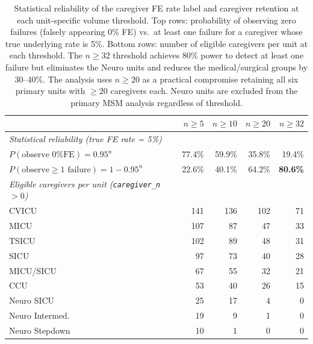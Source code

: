 \documentclass[11pt]{article}
\begin{document}
\begin{table}[h!]
\centering
\small
\begin{tabular}{lrrrr}
\toprule
 & $n \geq 5$ & $n \geq 10$ & $n \geq 20$ & $n \geq 32$ \\
\midrule
\textit{Statistical reliability (true FE rate = 5\%)} & & & & \\
\quad $P(\text{observe 0\% FE}) = 0.95^n$ & 77.4\% & 59.9\% & 35.8\% & 19.4\% \\
\quad $P(\text{observe} \geq 1 \text{ failure}) = 1 - 0.95^n$ & 22.6\% & 40.1\% & 64.2\% & \textbf{80.6\%} \\
\midrule
\textit{Eligible caregivers per unit (\texttt{caregiver\_n} $> 0$)} & & & & \\
\quad CVICU           & 141 & 136 & 102 & 71 \\
\quad MICU            & 107 &  87 &  47 & 33 \\
\quad TSICU           & 102 &  89 &  48 & 31 \\
\quad SICU            &  97 &  73 &  40 & 28 \\
\quad MICU/SICU       &  67 &  55 &  32 & 21 \\
\quad CCU             &  53 &  40 &  26 & 15 \\
\quad Neuro SICU      &  25 &  17 &   4 &  0 \\
\quad Neuro Intermed. &  19 &   9 &   1 &  0 \\
\quad Neuro Stepdown  &  10 &   1 &   0 &  0 \\
\bottomrule
\end{tabular}
\caption{Statistical reliability of the caregiver FE rate label and
caregiver retention at each unit-specific volume threshold. Top rows:
probability of observing zero failures (falsely appearing 0\% FE) vs.\
at least one failure for a caregiver whose true underlying rate is 5\%.
Bottom rows: number of eligible caregivers per unit at each threshold.
The $n \geq 32$ threshold achieves 80\% power to detect at least one
failure but eliminates the Neuro units and reduces the medical/surgical
groups by 30--40\%. The analysis uses $n \geq 20$ as a practical
compromise retaining all six primary units with $\geq 20$ caregivers each.
Neuro units are excluded from the primary MSM analysis regardless of threshold.}
\label{tab:threshold}
\end{table}
\end{document}
